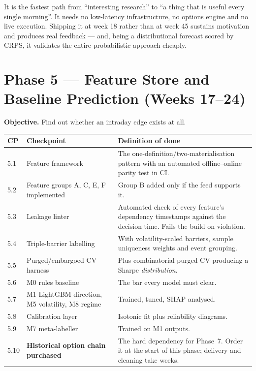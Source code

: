 \begin{keybox}[title={Why the gap forecaster is placed here}]
It is the fastest path from ``interesting research'' to ``a thing that is useful
every single morning''. It needs no low-latency infrastructure, no options
engine and no live execution. Shipping it at week 18 rather than at week 45
sustains motivation and produces real feedback --- and, being a distributional
forecast scored by CRPS, it validates the entire probabilistic approach cheaply.
\end{keybox}

\section{Phase 5 --- Feature Store and Baseline Prediction (Weeks 17--24)}

\textbf{Objective.} Find out whether an intraday edge exists at all.

\begin{longtable}{@{}p{1.4cm}p{6.0cm}p{7.0cm}@{}}
\toprule
\textbf{CP} & \textbf{Checkpoint} & \textbf{Definition of done}\\
\midrule
5.1 & Feature framework & The one-definition/two-materialisation pattern with an
automated offline--online parity test in CI.\\
5.2 & Feature groups A, C, E, F implemented & Group B added only if the feed
supports it.\\
5.3 & Leakage linter & Automated check of every feature's dependency timestamps
against the decision time. Fails the build on violation.\\
5.4 & Triple-barrier labelling & With volatility-scaled barriers, sample
uniqueness weights and event grouping.\\
5.5 & Purged/embargoed CV harness & Plus combinatorial purged CV producing a
Sharpe \emph{distribution}.\\
5.6 & M0 rules baseline & The bar every model must clear.\\
5.7 & M1 LightGBM direction, M5 volatility, M8 regime & Trained, tuned, SHAP
analysed.\\
5.8 & Calibration layer & Isotonic fit plus reliability diagrams.\\
5.9 & M7 meta-labeller & Trained on M1 outputs.\\
5.10 & \textbf{Historical option chain purchased} & The hard dependency for
Phase~7. Order it at the start of this phase; delivery and cleaning take weeks.\\
\bottomrule
\end{longtable}

